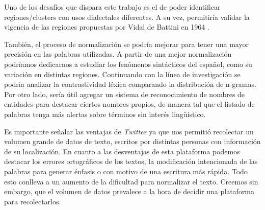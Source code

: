 Uno de los desafíos que dispara este trabajo es el de poder identificar regiones/clusters con usos dialectales diferentes. A su vez, permitiría validar la vigencia de las regiones propuestas por Vidal de Battini en 1964 \cite{vidal1964espanol}. %

También, el proceso de normalización se podría mejorar para tener una mayor precisión en las palabras utilizadas. A partir de una mejor normalización podríamos dedicarnos a estudiar los fenómenos sintácticos del español, como su variación en distintas regiones. Continuando con la línea de investigación se podría analizar la contrastividad léxica comparando la distribución de n-gramas. Por otro lado, sería útil agregar un sistema de reconocimiento de nombres de entidades para destacar ciertos nombres propios, de manera tal que el listado de palabras tenga más alertas sobre términos sin interés lingüístico.

Es importante señalar las ventajas de \textit{Twitter} ya que nos permitió recolectar un volumen grande de datos de texto, escritos por distintas personas con información de su localización. En cuanto a las desventajas de esta plataforma podemos destacar los errores ortográficos de los textos, la modificación intencionada de las palabras para generar énfasis o con motivo de una escritura más rápida. Todo esto conlleva a un aumento de la dificultad para normalizar el texto. Creemos sin embargo, que el volumen de datos prevalece a la hora de decidir una plataforma para recolectarlos.

